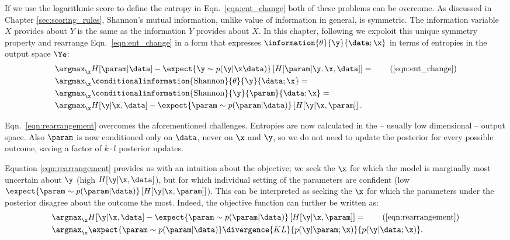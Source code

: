 If we use the logarithmic score to define the entropy in Eqn.\ \eqref{eqn:ent_change} both of these problems can be overcome. As discussed in Chapter \ref{sec:scoring_rules}, Shannon's mutual information, unlike value of information in general, is symmetric. The information variable $X$ provides about $Y$ is the same as the information $Y$ provides about $X$. In this chapter, following \citep{ExactInformation} we expoloit this unique symmetry property and rearrange Eqn.\ \eqref{eqn:ent_change} in a form that expresses $\information{\theta}{\y}{\data;\x}$ in terms of entropies in the output space $\Ye$:
%
\begin{align}
	&\argmax_{\x} H[\param | \data] - \expect{\y\sim p(\y|\x\data)} \left[ H[\param| \y, \x,\data] \right] = \tag{\ref{eqn:ent_change}}\\
	&\argmax_{\x} \conditionalinformation{\mbox{Shannon}}{\theta}{\y}{\data;\x} =\\
	&\argmax_{\x} \conditionalinformation{\mbox{Shannon}}{\y}{\param}{\data;\x} =\\
	&\argmax_{\x} H[\y \vert \x, \data] - \expect{\param\sim p(\param|\data)} \left[ H[\y \vert \x,\param] \right]. \label{eqn:rearrangement} 
\end{align}

Eqn.\ \eqref{eqn:rearrangement} overcomes the aforementioned challenges. Entropies are now calculated in the -- usually low dimensional -- output space. Also $\param$ is now conditioned only on $\data$, never on $\x$ and $\y$, so we do not need to update the posterior for every possible outcome, saving a factor of $k\cdot l$ posterior updates.

Equation \eqref{eqn:rearrangement} provides us with an intuition about the objective; we seek the $\x$ for which the model is marginally most uncertain about $\y$ (high $H[\y \vert \x, \data]$), but for which individual setting of the parameters are confident (low $\expect{\param\sim p(\param|\data)} \left[ H[\y \vert \x,\param] \right]$). This can be interpreted as seeking the $\x$ for which the parameters under the posterior disagree about the outcome the most. Indeed, the objective function can further be written as:
%
\begin{align}
	&\argmax_{\x} H[\y \vert \x, \data] - \expect{\param\sim p(\param|\data)} \left[ H[\y \vert \x,\param] \right] = \tag{\ref{eqn:rearrangement}}\\
	&\argmax_{\x} \expect{\param\sim p(\param|\data)}  \divergence{KL}{p(\y\vert\param;\x)}{p(\y\vert\data;\x)}.
\end{align}

